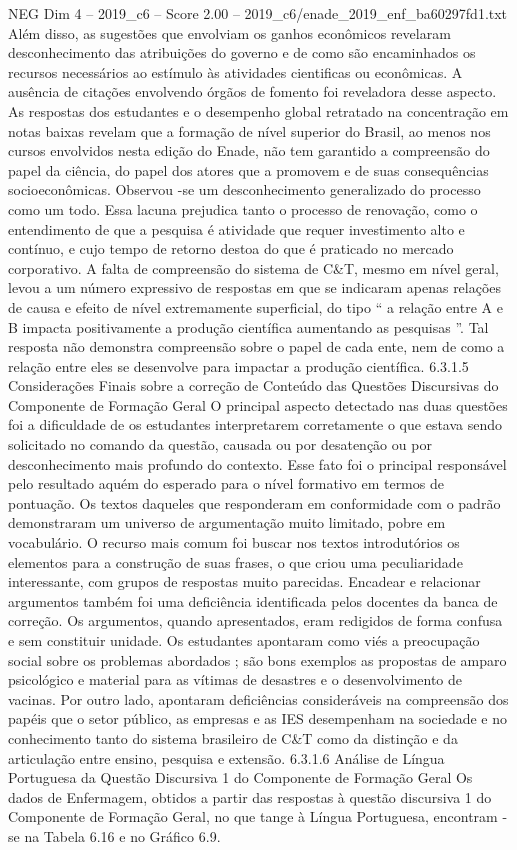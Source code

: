 \begin{textsample}{NEG Dim 4 – 2019\_c6 – Score 2.00 – 2019\_c6/enade\_2019\_enf\_ba60297fd1.txt}
Além disso, as sugestões que envolviam os ganhos econômicos revelaram desconhecimento das atribuições do governo e de como são encaminhados os recursos necessários ao estímulo às atividades cientificas ou econômicas.
A ausência de citações envolvendo órgãos de fomento foi reveladora desse aspecto.
As respostas dos estudantes e o desempenho global retratado na concentração em notas baixas revelam que a formação de nível superior do Brasil, ao menos nos cursos envolvidos nesta edição do Enade, não tem garantido a compreensão do papel da ciência, do papel dos atores que a promovem e de suas consequências socioeconômicas.
Observou -se um desconhecimento generalizado do processo como um todo.
Essa lacuna prejudica tanto o processo de renovação, como o entendimento de que a pesquisa é atividade que requer investimento alto e contínuo, e cujo tempo de retorno destoa do que é praticado no mercado corporativo.
A falta de compreensão do sistema de C\&T, mesmo em nível geral, levou a um número expressivo de respostas em que se indicaram apenas relações de causa e efeito de nível extremamente superficial, do tipo “ a relação entre A e B impacta positivamente a produção científica aumentando as pesquisas ”.
Tal resposta não demonstra compreensão sobre o papel de cada ente, nem de como a relação entre eles se desenvolve para impactar a produção científica. 6.3.1.5 Considerações Finais sobre a correção de Conteúdo das Questões Discursivas do Componente de Formação Geral O principal aspecto detectado nas duas questões foi a dificuldade de os estudantes interpretarem corretamente o que estava sendo solicitado no comando da questão, causada ou por desatenção ou por desconhecimento mais profundo do contexto.
Esse fato foi o principal responsável pelo resultado aquém do esperado para o nível formativo em termos de pontuação.
Os textos daqueles que responderam em conformidade com o padrão demonstraram um universo de argumentação muito limitado, pobre em vocabulário.
O recurso mais comum foi buscar nos textos introdutórios os elementos para a construção de suas frases, o que criou uma peculiaridade interessante, com grupos de respostas muito parecidas.
Encadear e relacionar argumentos também foi uma deficiência identificada pelos docentes da banca de correção.
Os argumentos, quando apresentados, eram redigidos de forma confusa e sem constituir unidade.
Os estudantes apontaram como viés a preocupação social sobre os problemas abordados ; são bons exemplos as propostas de amparo psicológico e material para as vítimas de desastres e o desenvolvimento de vacinas.
Por outro lado, apontaram deficiências consideráveis na compreensão dos papéis que o setor público, as empresas e as IES desempenham na sociedade e no conhecimento tanto do sistema brasileiro de C\&T como da distinção e da articulação entre ensino, pesquisa e extensão. 6.3.1.6 Análise de Língua Portuguesa da Questão Discursiva 1 do Componente de Formação Geral Os dados de Enfermagem, obtidos a partir das respostas à questão discursiva 1 do Componente de Formação Geral, no que tange à Língua Portuguesa, encontram -se na Tabela 6.16 e no Gráfico 6.9.

\end{textsample}
